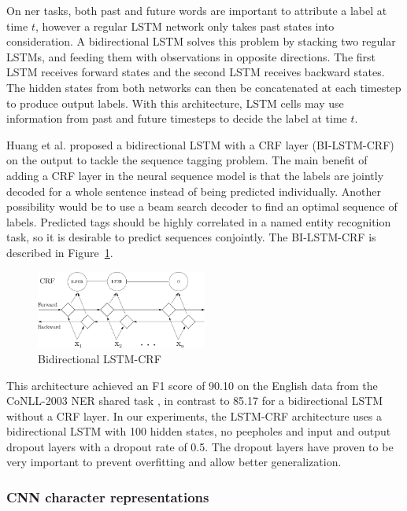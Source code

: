 \documentclass{nle}
\begin{document}
On \gls{ner} tasks, both past and future words are important 
to attribute a label at time $ t $, however a regular LSTM network only takes 
past states into consideration. A bidirectional LSTM solves this problem by stacking 
two regular LSTMs, and feeding them with observations in opposite directions. The first LSTM 
receives forward states and the second LSTM receives backward states. The hidden states from both 
networks can then be concatenated at each timestep to produce output labels. With this 
architecture, LSTM cells may use information from past and future timesteps to decide 
the label at time $ t $.

Huang et al.  proposed a bidirectional LSTM with a CRF layer (BI-LSTM-CRF) on 
the output to tackle the sequence tagging problem. The main benefit of adding a CRF layer 
in the neural sequence model is that the labels are jointly decoded for a whole sentence 
instead of being predicted individually. Another possibility would be to use a beam search
decoder to find an optimal sequence of labels. Predicted tags should be highly correlated 
in a named entity recognition task, so it is desirable to predict sequences conjointly.
The BI-LSTM-CRF is described in Figure~\ref{fig:bi_lstm_crf}.

\begin{figure}[h]
  \centering
  \includegraphics[width=0.5\textwidth]{pics/bi_lstm_crf}
  \caption{Bidirectional LSTM-CRF}
  \label{fig:bi_lstm_crf}
\end{figure}

This architecture achieved an F1 score of 90.10 on the English data from the CoNLL-2003 
NER shared task \cite{KimSang2003}, in contrast to 85.17 for a bidirectional LSTM without 
a CRF layer. 
In our experiments, the LSTM-CRF architecture uses a bidirectional LSTM with 100 
hidden states, no peepholes and input and output dropout layers with a dropout
rate of 0.5. The dropout layers have proven to be very important to prevent overfitting 
and allow better generalization.

\subsubsection{CNN character representations}
\label{sssec:lstm_crf_cnn}
\end{document}
